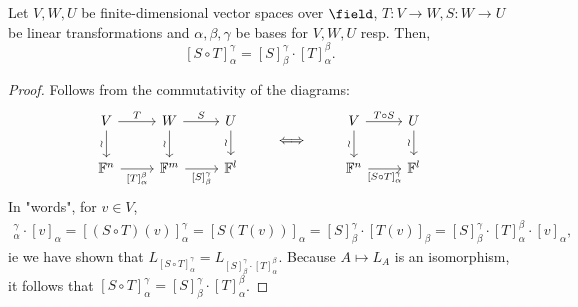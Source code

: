 \begin{corollary}
    Let $V, W, U$ be finite-dimensional vector spaces over $\field$, $T : V \to W, S : W \to U$ be linear transformations and $\alpha, \beta, \gamma$ be bases for $V, W, U$ resp. Then, \[
    [S \circ T]_\alpha^\gamma = [S]_\beta^\gamma \cdot [T]_\alpha^\beta.    
    \]
\end{corollary}
\begin{proof}
    Follows from the commutativity of the diagrams:
\[
\begin{tikzcd}
        V & W & U \\
        {\mathbb{F}^n} & {\mathbb{F}^m} & {\mathbb{F}^l}
        \arrow["T", from=1-1, to=1-2]
        \arrow["S", from=1-2, to=1-3]
        \arrow["\wr"', from=1-2, to=2-2]
        \arrow["\wr"', from=1-3, to=2-3]
        \arrow["{[T]_\alpha^\beta}"', from=2-1, to=2-2]
        \arrow["{[S]_\beta^\gamma}"', from=2-2, to=2-3]
        \arrow["\wr"', from=1-1, to=2-1]
    \end{tikzcd}
    \qquad \iff\qquad 
    \begin{tikzcd}
        V & U \\
        {\mathbb{F}^n} & {\mathbb{F}^l}
        \arrow["\wr"', from=1-1, to=2-1]
        \arrow["\wr"', from=1-2, to=2-2]
        \arrow["{T \circ S}", from=1-1, to=1-2]
        \arrow["{[S \circ T]_\alpha^\gamma}"', from=2-1, to=2-2]
    \end{tikzcd}
\]    
    In "words", for $v \in V$,
    \begin{align*}
        [S \circ T]_\alpha^\gamma \cdot [v]_\alpha = [(S \circ T)(v)]_\alpha^\gamma = [S(T(v))]_\alpha = [S]_\beta^\gamma \cdot [T(v)]_\beta = [S]_\beta^\gamma \cdot [T]_\alpha^\beta \cdot [v]_\alpha,
    \end{align*}
    ie we have shown that $L_{[S \circ T]_\alpha^\gamma} = L_{[S]_\beta^\gamma \cdot [T]_\alpha^\beta}$. Because $A \mapsto L_A$ is an isomorphism, it follows that $[S \circ T]_\alpha^\gamma = [S]_\beta^\gamma \cdot [T]_\alpha^\beta$.
\end{proof}